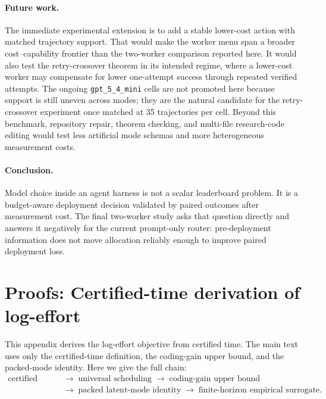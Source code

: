\documentclass{article}
\begin{document}
\paragraph{Future work.}
The immediate experimental extension is to add a stable lower-cost action with matched trajectory support.
That would make the worker menu span a broader cost--capability frontier than the two-worker comparison reported here.
It would also test the retry-crossover theorem in its intended regime, where a lower-cost worker may compensate for lower one-attempt success through repeated verified attempts.
The ongoing \texttt{gpt\_5\_4\_mini} cells are not promoted here because support is still uneven across modes; they are the natural candidate for the retry-crossover experiment once matched at 35 trajectories per cell.
Beyond this benchmark, repository repair, theorem checking, and multi-file research-code editing would test less artificial mode schemas and more heterogeneous measurement costs.

\paragraph{Conclusion.}
Model choice inside an agent harness is not a scalar leaderboard problem.
It is a budget-aware deployment decision validated by paired outcomes after measurement cost.
The final two-worker study asks that question directly and answers it negatively for the current prompt-only router: pre-deployment information does not move allocation reliably enough to improve paired deployment loss.




\appendix



\section{Proofs: Certified-time derivation of log-effort}
\label{app:certified-log-effort}

This appendix derives the log-effort objective from certified time.
The main text uses only the certified-time definition, the coding-gain upper bound, and the
packed-mode identity.  Here we give the full chain:
\[
\begin{aligned}
    \text{certified time}
    &\;\longrightarrow\;
    \text{universal scheduling}
    \;\longrightarrow\;
    \text{coding-gain upper bound}
    \\
    &\;\longrightarrow\;
    \text{packed latent-mode identity}
    \;\longrightarrow\;
    \text{finite-horizon empirical surrogate}.
\end{aligned}
\]
\end{document}
